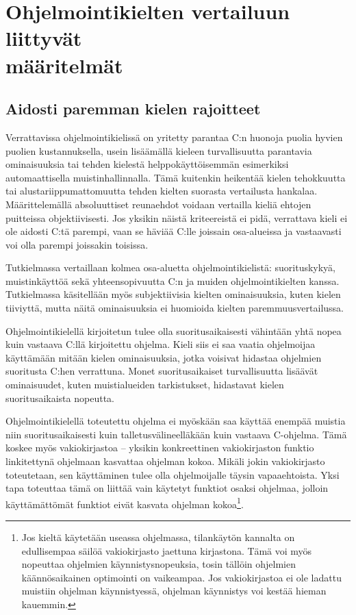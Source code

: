 \section[Ohjelmointikielten vertailuun liittyvät määritelmät]
{Ohjelmointikielten vertailuun liittyvät \\ määritelmät}

\subsection{Aidosti paremman kielen rajoitteet}
\label{sec:abs}

Verrattavissa ohjelmointikielissä on yritetty parantaa C:n huonoja puolia
hyvien puolien kustannuksella, usein lisäämällä kieleen turvallisuutta
parantavia ominaisuuksia tai tehden kielestä helppokäyttöisemmän esimerkiksi
automaattisella muistinhallinnalla. Tämä kuitenkin heikentää kielen tehokkuutta
tai alustariippumattomuutta tehden kielten suorasta vertailusta hankalaa.
Määrittelemällä absoluuttiset reunaehdot voidaan vertailla kieliä
ehtojen puitteissa objektiivisesti. Jos yksikin näistä kriteereistä ei pidä,
verrattava kieli ei ole aidosti C:tä parempi, vaan se häviää C:lle joissain
osa-alueissa ja vastaavasti voi olla parempi joissakin toisissa.

Tutkielmassa vertaillaan kolmea osa-aluetta ohjelmointikielistä: suorituskykyä,
muistinkäyttöä sekä yhteensopivuutta C:n ja muiden ohjelmointikielten kanssa.
Tutkielmassa käsitellään myös subjektiivisia kielten ominaisuuksia, kuten
kielen tiiviyttä, mutta näitä
ominaisuuksia ei huomioida kielten paremmuusvertailussa.

Ohjelmointikielellä kirjoitetun tulee olla suoritusaikaisesti vähintään yhtä nopea
kuin vastaava C:llä kirjoitettu ohjelma. Kieli siis ei saa vaatia ohjelmoijaa
käyttämään mitään kielen ominaisuuksia, jotka voisivat hidastaa ohjelmien
suoritusta C:hen verrattuna. Monet suoritusaikaiset turvallisuutta lisäävät
ominaisuudet, kuten muistialueiden tarkistukset, hidastavat kielen suoritusaikaista
nopeutta.

Ohjelmointikielellä toteutettu ohjelma ei myöskään saa käyttää enempää muistia
niin suoritusaikaisesti kuin talletusvälineelläkään kuin vastaava C-ohjelma. Tämä
koskee myös vakiokirjastoa -- yksikin konkreettinen
vakiokirjaston funktio linkitettynä ohjelmaan kasvattaa ohjelman kokoa. Mikäli
jokin vakiokirjasto toteutetaan, sen käyttäminen tulee olla ohjelmoijalle
täysin vapaaehtoista. Yksi tapa toteuttaa tämä on liittää vain käytetyt
funktiot osaksi ohjelmaa, jolloin käyttämättömät funktiot eivät kasvata
ohjelman kokoa\footnote{Jos kieltä käytetään useassa ohjelmassa, tilankäytön
kannalta on edullisempaa säilöä vakiokirjasto jaettuna kirjastona. Tämä voi
myös nopeuttaa ohjelmien käynnistysnopeuksia, tosin tällöin ohjelmien
käännösaikainen optimointi on vaikeampaa. Jos vakiokirjastoa ei ole ladattu
muistiin ohjelman käynnistyessä, ohjelman käynnistys voi kestää hieman
kauemmin.}.

